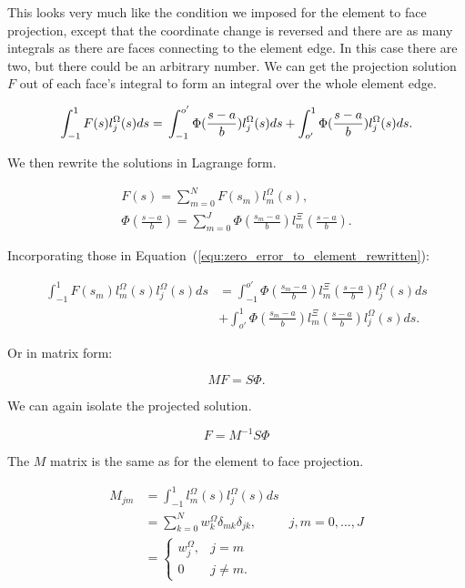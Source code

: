 \noindent
This looks very much like the condition we imposed for the element to face projection, except that
the coordinate change is reversed and there are as many integrals as there are faces connecting to
the element edge. In this case there are two, but there could be an arbitrary number. We can get the
projection solution \(F\) out of each face's integral to form an integral over the whole element
edge.

\begin{equation} \label{equ:zero_error_to_element_rewritten}
    \int_{-1}^{1}F(s)l_j^\Omega(s)ds = \\
    \int_{-1}^{o'} \Phi (\frac{s -a}{b}) l_j^\Omega(s)ds + 
    \int_{o'}^{1} \Phi(\frac{s-a}{b})l_j^\Omega(s)ds.
\end{equation}

\noindent
We then rewrite the solutions in Lagrange form.

\begin{gather}
    F(s) = \sum_{m = 0}^{N}F(s_m)l_m^\Omega(s), \\
    \Phi(\frac{s -a}{b}) = \sum_{m = 0}^{J}\Phi(\frac{s_m -a}{b})l_m^\Xi(\frac{s -a}{b}).
\end{gather}

\noindent
Incorporating those in Equation~(\ref{equ:zero_error_to_element_rewritten}):

\begin{equation} 
    \begin{aligned}
        \int_{-1}^{1}F(s_m)l_m^\Omega(s) l_j^\Omega(s)ds &= \int_{-1}^{o'} \Phi(\frac{s_m -a}{b})l_m^\Xi(\frac{s -a}{b}) l_j^\Omega(s)ds \\
        &+ \int_{o'}^{1} \Phi(\frac{s_m -a}{b})l_m^\Xi(\frac{s -a}{b}) l_j^\Omega(s)ds.
    \end{aligned}
\end{equation}

\noindent
Or in matrix form:

\begin{equation} 
    MF = S \Phi.
\end{equation}

\noindent
We can again isolate the projected solution.

\begin{equation} 
    F = M^{-1} S \Phi
\end{equation}

\noindent
The \(M\) matrix is the same as for the element to face projection.

\begin{equation} \label{equ:matrix_M_face_to_element}
    \begin{aligned}
        M_{jm} &= \int_{-1}^{1}l_m^{\Omega}(s)l_j^{\Omega}(s)ds \\
        &= \sum_{k = 0}^{N} w_k ^{\Omega} \delta_{mk}\delta_{jk}, & j, m = 0, \ldots, J \\
        &= \left \{ \begin{matrix}
            w_j^{\Omega }, & j = m \\ 
            0 & j \neq m.
            \end{matrix}\right.
    \end{aligned}
\end{equation}

